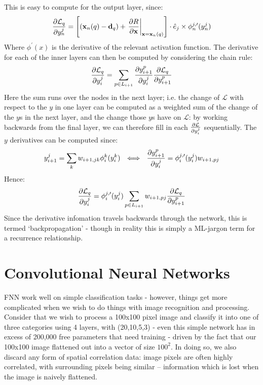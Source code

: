 \documentclass[10pt, twocolumn]{article}
\renewcommand\vec[1]{\boldsymbol{\textbf{#1}}}
\begin{document}
		This is easy to compute for the output layer, since:
		\begin{equation}
			\pdiv{\mathcal{L}_q}{y_n^j} = \left[\left(\vec{x}_n(q) - \vec{d}_q\right) + \left. \pdiv{R}{\vec{x}} \right|_{\vec{x} = \vec{x}_n(q)} \right] \cdot \hat{e}_j \times \phi_n^{j,\prime}(y_n^j)
		\end{equation}
		Where $\phi^\prime(x)$ is the derivative of the relevant activation function. The derivative for each of the inner layers can then be computed by considering the chain rule:
		\begin{equation}
			\frac{\partial \mathcal{L}_q}{\partial y_i^j} = \sum_{p \in L_{i+1}} \frac{\partial y_{i+1}^p}{\partial y_i^j} \frac{\partial \mathcal{L}_q}{\partial y_{i+1}^p}
		\end{equation}
		Here the sum runs over the nodes in the next layer; i.e. the change of $\mathcal{L}$ with respect to the $y$ in one layer can be computed as a weighted sum of the change of the $y$s in the next layer, and the change those $y$s have on $\mathcal{L}$: by working backwards from the final layer, we can therefore fill in each $\frac{\partial \mathcal{L}}{\partial y_i^j}$ sequentially. The $y$ derivatives can be computed since:
		\begin{equation}
			y_{i+1}^j = \sum_k w_{i+1,jk} \phi_i^k(y_i^k) ~~\Longleftrightarrow~~ \frac{\partial y_{i+1}^p}{\partial y_i^j} = \phi_i^{j,\prime}(y_i^j) w_{i+1,pj}
		\end{equation}
		Hence:
		\begin{equation}
			\frac{\partial \mathcal{L}_q}{\partial y_i^j} = \phi_i^{j,\prime}(y_i^j) \sum_{p \in L_{i+1}} w_{i+1,pj}  \frac{\partial \mathcal{L}_q}{\partial y_{i+1}^p} \label{E:Backprop}
		\end{equation}
		Since the derivative infomation travels backwards through the network, this is termed `backpropagation' - though in reality this is simply a ML-jargon term for a recurrence relationship.

	\section{Convolutional Neural Networks}

		FNN work well on simple classification tasks - however, things get more complicated when we wish to do things with image recognition and processing. Consider that we wish to process a 100x100 pixel image and classify it into one of three categories using 4 layers, with (20,10,5,3) - even this simple network has in excess of 200,000 free parameters that need training - driven by the fact that our 100x100 image flattened out into a vector of size $100^2$. In doing so, we also discard any form of spatial correlation data: image pixels are often highly correlated, with surrounding pixels being similar -- information which is lost when the image is naively flattened. 
\end{document}
